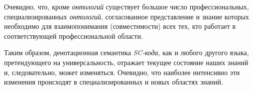 \begin{SCn}
{Очевидно, что, кроме  \textit{онтологий} существует большое число профессиональных, специализированных \textit{онтологий}, согласованное представление и знание которых необходимо для взаимопонимания (совместимости) всех тех, кто работает в соответствующей профессиональной области. 

Таким образом, денотационная семантика \textit{SC-кода}, как и любого другого языка, претендующего на универсальность, отражает текущее состояние наших знаний и, следовательно, может изменяться. Очевидно, что наиболее интенсивно эти изменения происходят в специализированных и новых областях знаний.
}

\end{SCn}